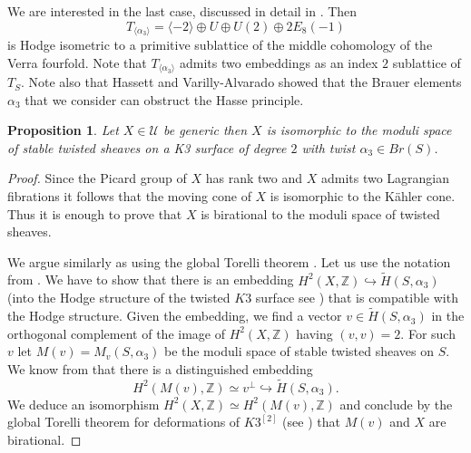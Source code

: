 \documentclass[a4paper,11pt]{amsart}
\newtheorem{prop}[thm]{Proposition}
\theoremstyle{definition}
\numberwithin{equation}{section}
\numberwithin{equation}{section} \theoremstyle{definition}
\begin{document}
We are interested in the last case, discussed in detail in \cite[\S 9.8]{vG}. Then $$T_{\langle\alpha_3\rangle}=\langle -2 \rangle\oplus U\oplus U(2)\oplus 2 E_8(-1)$$ is Hodge isometric to a primitive sublattice 
of the middle cohomology of the Verra fourfold. Note that $T_{\langle\alpha_3\rangle}$ admits two embeddings as an index $2$ sublattice of $T_S$.  Note also that Hassett and Varilly-Alvarado \cite{HV} showed that the Brauer elements $\alpha_3$ that we consider can obstruct the Hasse principle.

\begin{prop}\label{twist} Let $X\in \mathcal{U}$ be generic then $X$ is isomorphic to the moduli space of stable twisted sheaves on a K3 surface of degree 
$2$ with twist $\alpha_3\in Br(S)$.
\end{prop}
\begin{proof} 
Since the Picard group of $X$ has rank two and $X$ admits two Lagrangian fibrations it follows that the moving cone of $X$ is isomorphic to the 
K\"{a}hler cone. Thus it is enough to prove that $X$ is birational to the moduli space of twisted sheaves.

We argue similarly as \cite{Addington} using the global Torelli theorem \cite{Verbitsky}.
Let us use the notation from \cite[Proposition~4.1]{Huy}.
We have to show that
there is an embedding $H^2(X,{\mathbb{Z}}) \hookrightarrow \tilde{H}(S,\alpha_3)$  (into the Hodge structure of the twisted $K3$ surface see \cite[Definition~2.5]{Huy}) that is compatible with the Hodge structure.
Given the embedding, we find a vector $v\in \tilde{H}(S,\alpha_3)$ in the orthogonal complement of the image of $H^2(X,{\mathbb{Z}})$ having $(v,v)=2$.
 For such $v$ let $M(v)=M_v(S,\alpha_3)$  be the moduli space of stable twisted sheaves on $S$. We know from \cite[Theorem~3.19]{Yo} that  there is a distinguished embedding
$$H^2(M(v),{\mathbb{Z}})\simeq v^{\perp}\hookrightarrow \tilde{H}(S,\alpha_3).$$
 We deduce an isomorphism $H^2(X,{\mathbb{Z}})\simeq H^2(M(v),{\mathbb{Z}})$ and conclude by the global Torelli theorem
for deformations of $K3^{[2]}$ (see \cite[Corollary 9.8]{Markmansurvey}) that  $M(v)$ and $X$ are birational. 


\end{proof}
\end{document}
